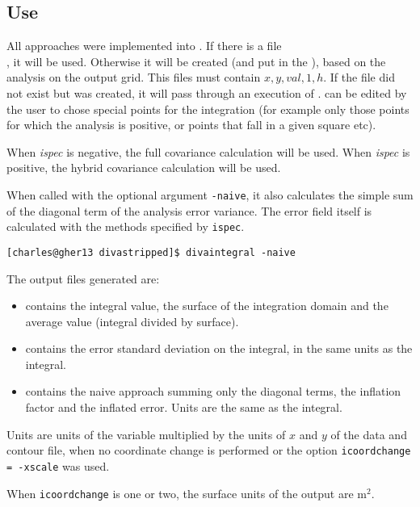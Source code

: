 \subsection{Use}

All approaches were implemented into . If there is a file\\ 
, it will be used.
Otherwise it will be created (and put in the ), based on the analysis on the output grid. This files must contain $x,y,val,1,h$. If the file did not exist but was created, it will pass through an execution of . 
 can be edited by the user to chose special points for the integration (for example only those points for which the analysis is positive, or points that fall in a given square etc). 

When {\it ispec } is negative, the full covariance calculation will be used. When {\it ispec } is positive, the hybrid covariance calculation will be used.

When called with the optional argument \texttt{-naive}, it also calculates the simple sum of the diagonal term of the analysis error variance. The error field itself is calculated with the methods specified by \texttt{ispec}. 

\begin{lstlisting}[style=Bash]
[charles@gher13 divastripped]$ divaintegral -naive
\end{lstlisting}

The output files generated are:
\begin{itemize}
\item {} contains the integral value, the surface of the integration domain and the average value (integral divided by surface).
\item {} contains the error standard deviation on the integral, in the same units as the integral.
\item {} contains the naive approach summing only the diagonal terms, the inflation factor and the inflated error. Units are the same as the integral.
\end{itemize}

Units are units of the variable multiplied by the units of $x$ and $y$ of the data and contour file, when no coordinate change is performed or the option {\tt icoordchange = -xscale} was used.

When {\tt icoordchange} is one or two, the surface units of the output are m$^2$.

